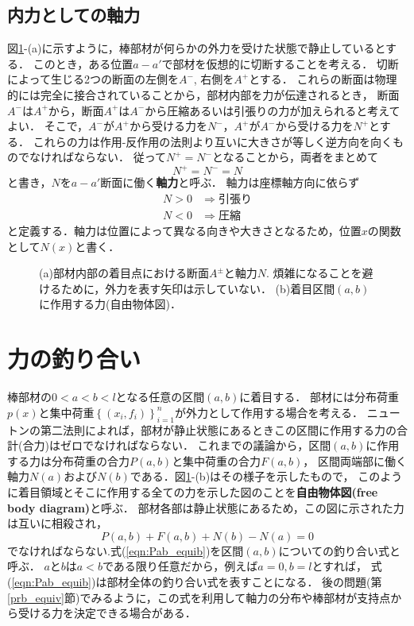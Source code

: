 \documentclass[11pt,a4j]{mybook2}
\begin{document}
\subsection{内力としての軸力}
図\ref{fig:defN}-(a)に示すように，棒部材が何らかの外力を受けた状態で静止しているとする．
このとき，ある位置$a-a'$で部材を仮想的に切断することを考える．
切断によって生じる2つの断面の左側を$A^-$, 右側を$A^+$とする．
これらの断面は物理的には完全に接合されていることから，部材内部を力が伝達されるとき，
断面$A^-$は$A^+$から，断面$A^+$は$A^-$から圧縮あるいは引張りの力が加えられると考えてよい．
そこで，$A^−$が$A^+$から受ける力を$N^-$，$A^+$が$A^-$から受ける力を$N^+$とする．
これらの力は作用-反作用の法則より互いに大きさが等しく逆方向を向くものでなければならない．
従って$N^+=N^-$となることから，両者をまとめて
\begin{equation}
	N^+=N^-=N
	\label{Npm}
\end{equation}
と書き，$N$を$a-a'$断面に働く{\rm \bf 軸力}と呼ぶ．
軸力は座標軸方向に依らず
\[
\begin{array}{cl}
	N>0 & \Rightarrow 引張り　\\
	N<0 & \Rightarrow 圧縮
\end{array}
\]
と定義する．軸力は位置によって異なる向きや大きさとなるため，位置$x$の関数として$N(x)$と書く．
\begin{figure}[h]
	\begin{center}
	\end{center}
	\caption{(a)部材内部の着目点における断面$A^{\pm}$と軸力$N$.
	煩雑になることを避けるために，外力を表す矢印は示していない．
	(b)着目区間$(a,b)$に作用する力(自由物体図)．} 
	\label{fig:defN}
\end{figure}
\section{力の釣り合い}
棒部材の$0<a<b<l$となる任意の区間$(a,b)$に着目する．
部材には分布荷重$p(x)$と集中荷重$\left\{(x_i, f_i)\right\}_{i=1}^n$が外力として作用する場合を考える．
ニュートンの第二法則によれば，部材が静止状態にあるときこの区間に作用する力の合計(合力)はゼロでなければならない．
これまでの議論から，区間$(a,b)$に作用する力は分布荷重の合力$P(a,b)$と集中荷重の合力$F(a,b)$，
区間両端部に働く軸力$N(a)$および$N(b)$である．図\ref{fig:defN}-(b)はその様子を示したもので，
このように着目領域とそこに作用する全ての力を示した図のことを{\rm \bf 自由物体図(free body diagram)}と呼ぶ．
部材各部は静止状態にあるため，この図に示された力は互いに相殺され，
\begin{equation}
	P(a,b)+F(a,b)+N(b)-N(a)=0
	\label{eqn:Pab_equib}
\end{equation}
でなければならない.式(\ref{eqn:Pab_equib})を区間$(a,b)$についての釣り合い式と呼ぶ．
$a$と$b$は$a<b$である限り任意だから，例えば$a=0, b=l$とすれば，
式(\ref{eqn:Pab_equib})は部材全体の釣り合い式を表すことになる．
後の問題(第\ref{prb_equiv}節)でみるように，この式を利用して軸力の分布や棒部材が支持点から受ける力を決定できる場合がある．
\\
\end{document}
